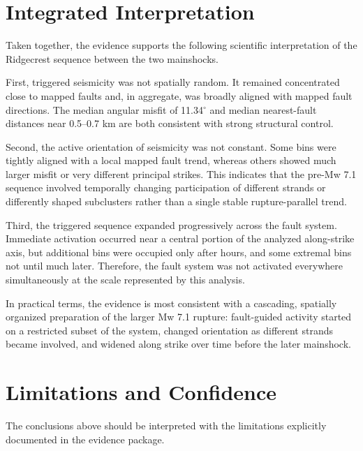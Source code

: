 \documentclass[11pt]{article}
\begin{document}
\section{Integrated Interpretation}
Taken together, the evidence supports the following scientific interpretation of the Ridgecrest sequence between the two mainshocks.

First, triggered seismicity was not spatially random. It remained concentrated close to mapped faults and, in aggregate, was broadly aligned with mapped fault directions. The median angular misfit of 11.34$^{\circ}$ and median nearest-fault distances near 0.5--0.7 km are both consistent with strong structural control.

Second, the active orientation of seismicity was not constant. Some bins were tightly aligned with a local mapped fault trend, whereas others showed much larger misfit or very different principal strikes. This indicates that the pre-Mw 7.1 sequence involved temporally changing participation of different strands or differently shaped subclusters rather than a single stable rupture-parallel trend.

Third, the triggered sequence expanded progressively across the fault system. Immediate activation occurred near a central portion of the analyzed along-strike axis, but additional bins were occupied only after hours, and some extremal bins not until much later. Therefore, the fault system was not activated everywhere simultaneously at the scale represented by this analysis.

In practical terms, the evidence is most consistent with a cascading, spatially organized preparation of the larger Mw 7.1 rupture: fault-guided activity started on a restricted subset of the system, changed orientation as different strands became involved, and widened along strike over time before the later mainshock.

\section{Limitations and Confidence}
The conclusions above should be interpreted with the limitations explicitly documented in the evidence package.
\end{document}
